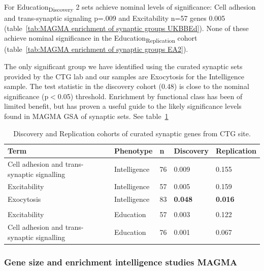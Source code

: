 For Education\textsubscript{Discovery} 2 sets achieve nominal levels of significance: Cell adhesion and trans-synaptic signaling p=.009 and Excitability n=57 genes 0.005 (table~\ref{tab:MAGMA enrichment of synaptic groups UKBBEd}). None of these achieve nominal significance in the Education\textsubscript{Replication} cohort (table~\ref{tab:MAGMA enrichment of synaptic groups EA2}). 

The only significant group we have identified using the curated synaptic sets provided by the CTG lab and our samples are Exocytosis for the Intelligence sample. The test statistic in the discovery cohort (0.48) is close to the nominal significance (p$<$0.05) threshold. Enrichment by functional class has been of limited benefit, but has proven a useful guide to the likely significance levels found in MAGMA GSA of synaptic sets. See table~\ref{tab:curated synaptic discovery and replication} 




\begin{table}[]
    \centering
    \begin{tabular}{lllll}
    \toprule
      Term   & Phenotype & n & Discovery & Replication  \\
      \midrule
         Cell adhesion and trans-synaptic signalling & Intelligence& 76  & 0.009 & 0.155\\
         Excitability & Intelligence& 57  & 0.005 & 0.159\\
          Exocytosis & Intelligence&83  & \textbf{0.048} & \textbf{0.016}  \\ 
          \\
           Excitability & Education & 57 & 0.003 &  0.122\\ 
           Cell adhesion and trans-synaptic signalling & Education & 76 & 0.001 & 0.067 \\ 
           \bottomrule
           
    \end{tabular}
    \caption{Discovery and Replication cohorts of curated synaptic genes from CTG site. }
    \label{tab:curated synaptic discovery and replication}
\end{table}


\subsubsection{Gene size and enrichment intelligence studies MAGMA}


